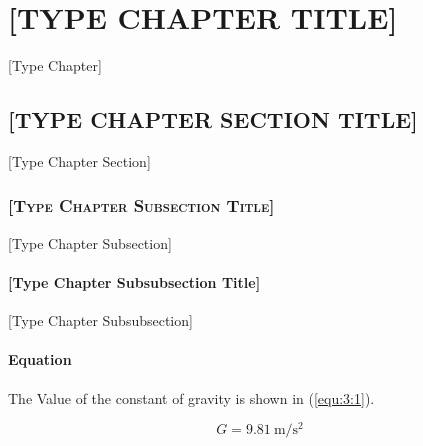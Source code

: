 \chapter{\MakeUppercase{[Type Chapter Title]}}
[Type Chapter]
\section{\MakeUppercase{[Type Chapter Section Title]}}
[Type Chapter Section]
\subsection{\textsc{[Type Chapter Subsection Title]}}
[Type Chapter Subsection]
\subsubsection{[Type Chapter Subsubsection Title]}
[Type Chapter Subsubsection]
\subsubsection{Equation}
The Value of the constant of gravity is shown in (\ref{equ:3:1}).

\begin{equation}
\label{equ:3:1}
G=9.81\ \si{\m\per\square\s}
\end{equation}